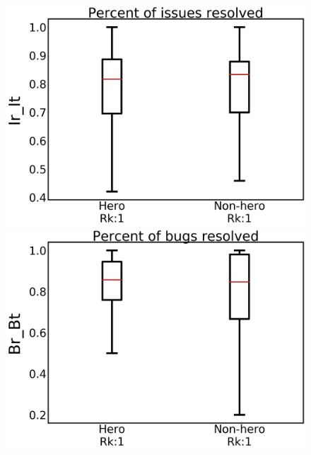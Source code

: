 \documentclass[sigconf]{acmart}
\theoremstyle{break}
\begin{document}
\begin{figure}[!t]
\begin{minipage}{.33\linewidth}
\centering
         \includegraphics[width=\linewidth,keepaspectratio]{./fig/Ir_It_w.png}
    \end{minipage}%
\begin{minipage}{.33\linewidth}
        \centering
        \includegraphics[width=\linewidth]{./fig/Br_Bt_w.png}
    \end{minipage}%
\begin{minipage}{.33\linewidth}
        \centering

\end{minipage}
\end{figure}
\end{document}
